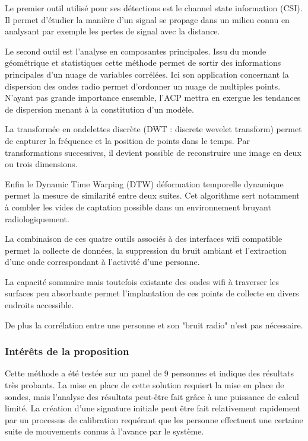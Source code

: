 \documentclass[conference,compsoc]{IEEEtran}
\begin{document}
Le premier outil utilisé pour ses détections est le channel state information (CSI). Il permet d'étudier la manière d'un signal se propage dans un milieu connu en analysant par exemple les pertes de signal avec la distance.

Le second outil est l'analyse en composantes principales. Issu du monde géométrique et statistiques cette méthode permet de sortir des informations principales d'un nuage de variables corrélées. Ici son application concernant la dispersion des ondes radio permet d'ordonner un nuage de multiples points. N'ayant pas grande importance ensemble, l'ACP mettra en exergue les tendances de dispersion menant à la constitution d'un modèle.

La transformée en ondelettes discrète (DWT : discrete wevelet transform) permet de capturer la fréquence et la position de points dans le temps. Par transformations successives, il devient possible de reconstruire une image en deux ou trois dimensions.

Enfin le Dynamic Time Warping (DTW) déformation temporelle dynamique permet la mesure de similarité entre deux suites. Cet algorithme sert notamment à combler les vides de captation possible dans un environnement bruyant radiologiquement.

La combinaison de ces quatre outils associés à des interfaces wifi compatible permet la collecte de données, la suppression du bruit ambiant et l'extraction d'une onde correspondant à l'activité d'une personne.

La capacité sommaire mais toutefois existante des ondes wifi à traverser les surfaces peu absorbante permet l'implantation de ces points de collecte en divers endroits accessible.

De plus la corrélation entre une personne et son "bruit radio" n'est pas nécessaire.

\subsubsection{Intérêts de la proposition}

Cette méthode a été testée sur un panel de 9 personnes et indique des résultats très probants. La mise en place de cette solution requiert la mise en place de sondes, mais l'analyse des résultats peut-être fait grâce à une puissance de calcul limité. La création d'une signature initiale peut être fait relativement rapidement par un processus de calibration requérant que les personne effectuent une certaine suite de mouvements connus à l'avance par le système.
\end{document}
